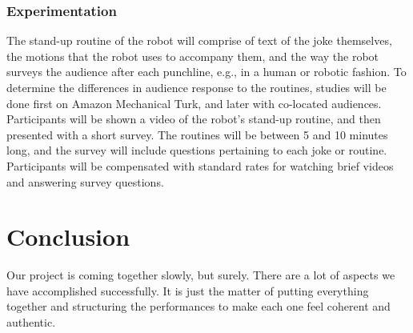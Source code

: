 \documentclass[onecolumn, draftclsnofoot,10pt, compsoc]{IEEEtran}
\begin{document}
\subsubsection{Experimentation}
The stand-up routine of the robot will comprise of text of the joke themselves, the motions that the robot uses to accompany them, and the way the robot surveys the audience after each punchline, e.g., in a human or robotic fashion.
To determine the differences in audience response to the routines, studies will be done first on Amazon Mechanical Turk, and later with co-located audiences.
Participants will be shown a video of the robot's stand-up routine, and then presented with a short survey.
The routines will be between 5 and 10 minutes long, and the survey will include questions pertaining to each joke or routine.
Participants will be compensated with standard rates for watching brief videos and answering survey questions.


\section{Conclusion}

Our project is coming together slowly, but surely. There are a lot of aspects we have accomplished successfully. It is just the matter of putting everything together and structuring the performances to make each one feel coherent and authentic.

\pagebreak


% 
% 
\end{document}
